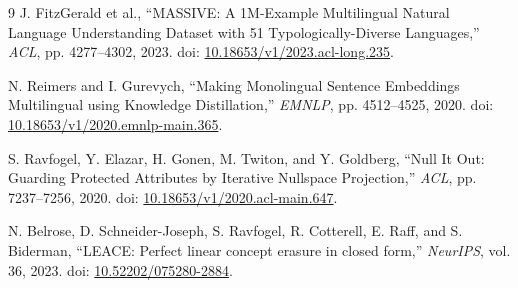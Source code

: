 \documentclass[10pt,twocolumn]{article}
\begin{document}
\begin{thebibliography}{9}
\small
{}
J. FitzGerald et al., ``MASSIVE: A 1M-Example Multilingual Natural Language Understanding Dataset with 51 Typologically-Diverse Languages,'' \emph{ACL}, pp. 4277--4302, 2023. doi: \href{https://doi.org/10.18653/v1/2023.acl-long.235}{10.18653/v1/2023.acl-long.235}.

N. Reimers and I. Gurevych, ``Making Monolingual Sentence Embeddings Multilingual using Knowledge Distillation,'' \emph{EMNLP}, pp. 4512--4525, 2020. doi: \href{https://doi.org/10.18653/v1/2020.emnlp-main.365}{10.18653/v1/2020.emnlp-main.365}.

S. Ravfogel, Y. Elazar, H. Gonen, M. Twiton, and Y. Goldberg, ``Null It Out: Guarding Protected Attributes by Iterative Nullspace Projection,'' \emph{ACL}, pp. 7237--7256, 2020. doi: \href{https://doi.org/10.18653/v1/2020.acl-main.647}{10.18653/v1/2020.acl-main.647}.

N. Belrose, D. Schneider-Joseph, S. Ravfogel, R. Cotterell, E. Raff, and S. Biderman, ``LEACE: Perfect linear concept erasure in closed form,'' \emph{NeurIPS}, vol. 36, 2023. doi: \href{https://doi.org/10.52202/075280-2884}{10.52202/075280-2884}.
\end{thebibliography}
\end{document}
